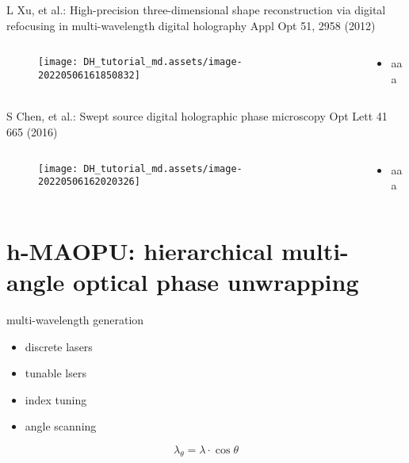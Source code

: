 \documentclass[t, aspectratio=169]{beamer}
\begin{document}
\begin{frame}{L Xu, et al.: High-precision three-dimensional shape reconstruction via digital refocusing in multi-wavelength digital holography}
	\vspace{-3 mm}
	\small Appl Opt 51, 2958 (2012)
	\begin{columns}
		\begin{column}{.6\textwidth}
			\begin{figure}
				\texttt{[image: DH\_tutorial\_md.assets/image-20220506161850832]}
			\end{figure}
		\end{column}
		\begin{column}{.4\textwidth}
			\begin{itemize}
				\item aaa
			\end{itemize}
		\end{column}
	\end{columns}
\end{frame}


\begin{frame}{S Chen, et al.: Swept source digital holographic phase microscopy}
	\vspace{-3 mm}
	\small Opt Lett 41 665 (2016)
	\begin{columns}
		\begin{column}{.6\textwidth}
			\begin{figure}
				\texttt{[image: DH\_tutorial\_md.assets/image-20220506162020326]}
			\end{figure}
		\end{column}
		\begin{column}{.4\textwidth}
			\begin{itemize}
				\item aaa
			\end{itemize}
		\end{column}
	\end{columns}
\end{frame}


\section{h-MAOPU: hierarchical multi-angle optical phase unwrapping}
\begin{frame}[c]
	\centering\LARGE\textbf{\secname}
\end{frame}


\begin{frame}{multi-wavelength generation}
	\begin{itemize}
		\item discrete lasers
		\item tunable lsers
		\item index tuning
		\item angle scanning
	\end{itemize}
\[ \lambda_\theta = \lambda\cdot\cos\theta \]
\end{frame}
\end{document}
